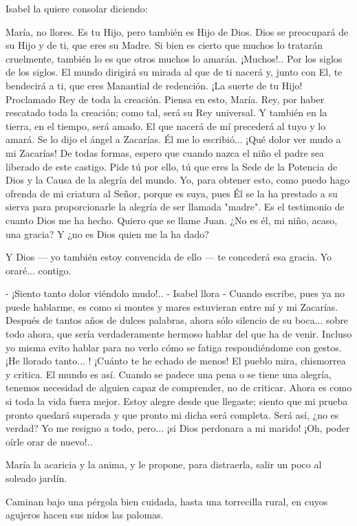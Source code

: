 \documentclass[12pt, twoside, openright]{book} %
\begin{document}
Isabel la quiere consolar diciendo: 

María, no llores. Es tu Hijo, pero también es Hijo de Dios. Dios se preocupará de su Hijo y de ti, que eres su Madre. Si bien es cierto que muchos lo tratarán cruelmente, también lo es que otros muchos lo amarán. ¡Muchos!.. Por los siglos de los siglos. El mundo dirigirá su mirada al que de ti nacerá y, junto con El, te bendecirá a ti, que eres Manantial de redención. ¡La suerte de tu Hijo! Proclamado Rey de toda la creación. Piensa en esto, María. Rey, por haber rescatado toda la creación; como tal, será su Rey universal. Y también en la tierra, en el tiempo, será amado. El que nacerá de mí precederá al tuyo y lo amará. Se lo dijo el ángel a Zacarías. Él me lo escribió... ¡Qué dolor ver mudo a mi Zacarías! De todas formas, espero que cuando nazca el niño el padre sea liberado de este castigo. Pide tú por ello, tú que eres la Sede de la Potencia de Dios y la Causa de la alegría del mundo. Yo, para obtener esto, como puedo hago ofrenda de mi criatura al Señor, porque es suya, pues Él se la ha prestado a su sierva para proporcionarle la alegría de ser llamada "madre". Es el testimonio de cuanto Dios me ha hecho. Quiero que se llame Juan. ¿No es él, mi niño, acaso, una gracia? Y ¿no es Dios quien me la ha dado? 

Y Dios — yo también estoy convencida de ello — te concederá esa gracia. Yo oraré... contigo. 

- ¡Siento tanto dolor viéndolo mudo!.. - Isabel llora - Cuando escribe, pues ya no puede hablarme, es como si montes y mares estuvieran entre mí y mi Zacarías. Después de tantos años de dulces palabras, ahora sólo silencio de su boca... sobre todo ahora, que sería verdaderamente hermoso hablar del que ha de venir. Incluso yo misma evito hablar para no verlo cómo se fatiga respondiéndome con gestos. ¡He llorado tanto... ! ¡Cuánto te he echado de menos! El pueblo mira, chismorrea y critica. El mundo es así. Cuando se padece una pena o se tiene una alegría, tenemos necesidad de alguien capaz de comprender, no de criticar. Ahora es como si toda la vida fuera mejor. Estoy alegre desde que llegaste; siento que mi prueba pronto quedará superada y que pronto mi dicha será completa. Será así, ¿no es verdad? Yo me resigno a todo, pero... ¡si Dios perdonara a mi marido! ¡Oh, poder oírle orar de nuevo!.. 

María la acaricia y la anima, y le propone, para distraerla, salir un poco al soleado jardín. 

Caminan bajo una pérgola bien cuidada, hasta una torrecilla rural, en cuyos agujeros hacen sus nidos las palomas. 
\end{document}
